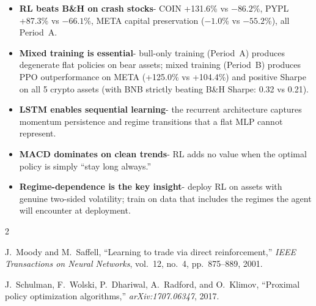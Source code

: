 \documentclass[12pt,a4paper]{article}
\begin{document}
\begin{tcolorbox}[findbox, title=Key findings]
\begin{itemize}[nosep,leftmargin=*]
  \item \textbf{RL beats B\&H on crash stocks}- COIN +131.6\% vs $-86.2$\%,
        PYPL +87.3\% vs $-66.1$\%, META capital preservation ($-1.0$\%
        vs $-55.2$\%), all Period~A.
  \item \textbf{Mixed training is essential}- bull-only training (Period~A)
        produces degenerate flat policies on bear assets; mixed training
        (Period~B) produces PPO outperformance on META (+125.0\% vs +104.4\%)
        and positive Sharpe on all 5 crypto assets (with BNB strictly beating
        B\&H Sharpe: 0.32 vs 0.21).
  \item \textbf{LSTM enables sequential learning}- the recurrent architecture
        captures momentum persistence and regime transitions that a flat MLP
        cannot represent.
  \item \textbf{MACD dominates on clean trends}- RL adds no value when
        the optimal policy is simply ``stay long always.''
  \item \textbf{Regime-dependence is the key insight}- deploy RL on assets
        with genuine two-sided volatility; train on data that includes
        the regimes the agent will encounter at deployment.
\end{itemize}
\end{tcolorbox}



\begin{thebibliography}{2}

J.~Moody and M.~Saffell,
``Learning to trade via direct reinforcement,''
\emph{IEEE Transactions on Neural Networks},
vol.~12, no.~4, pp.~875--889, 2001.

J.~Schulman, F.~Wolski, P.~Dhariwal, A.~Radford, and O.~Klimov,
``Proximal policy optimization algorithms,''
\emph{arXiv:1707.06347}, 2017.

\end{thebibliography}
\end{document}
